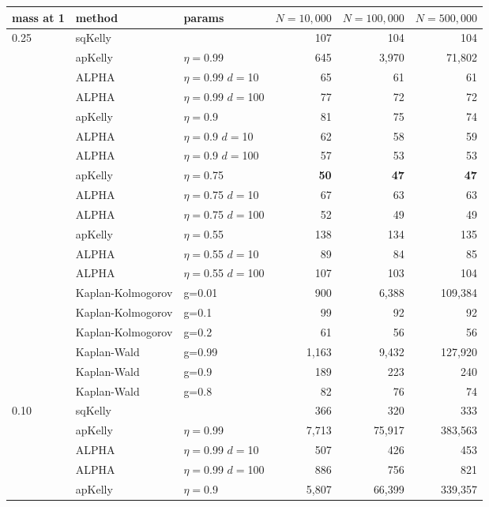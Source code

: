 \documentclass[12pt,runningheads]{llncs}
\begin{document}
{\begin{table}
\centering
\tiny
\begin{tabular}{lll|rrr} 
 mass at 1 & method & params & $N=10{,}000$ &  $N=100{,}000$ & $N=500{,}000$  \\
\hline 0.25 & sqKelly & & 107  & 104  & 104  \\
\cline{2-6} & apKelly & $\eta=$0.99 & 645  & 3,970  & 71,802  \\
\cline{2-6}
& ALPHA & $\eta=$0.99 $d=$10 & 65  & 61  & 61  \\
& ALPHA & $\eta=$0.99 $d=$100 & 77  & 72  & 72  \\
\cline{2-6} & apKelly & $\eta=$0.9 & 81  & 75  & 74  \\
\cline{2-6}
& ALPHA & $\eta=$0.9 $d=$10 & 62  & 58  & 59  \\
& ALPHA & $\eta=$0.9 $d=$100 & 57  & 53  & 53  \\
\cline{2-6} & apKelly & $\eta=$0.75 & \bf{50}  & \bf{47}  & \bf{47}  \\
\cline{2-6}
& ALPHA & $\eta=$0.75 $d=$10 & 67  & 63  & 63  \\
& ALPHA & $\eta=$0.75 $d=$100 & 52  & 49  & 49  \\
\cline{2-6} & apKelly & $\eta=$0.55 & 138  & 134  & 135  \\
\cline{2-6}
& ALPHA & $\eta=$0.55 $d=$10 & 89  & 84  & 85  \\
& ALPHA & $\eta=$0.55 $d=$100 & 107  & 103  & 104  \\
\cline{2-6}
 & Kaplan-Kolmogorov & g=0.01 & 900  & 6,388  & 109,384  \\
 & Kaplan-Kolmogorov & g=0.1 & 99  & 92  & 92  \\
 & Kaplan-Kolmogorov & g=0.2 & 61  & 56  & 56  \\
\cline{2-6}
 & Kaplan-Wald & g=0.99 & 1,163  & 9,432  & 127,920  \\
 & Kaplan-Wald & g=0.9 & 189  & 223  & 240  \\
 & Kaplan-Wald & g=0.8 & 82  & 76  & 74  \\
\hline 0.10 & sqKelly & & 366  & 320  & 333  \\
\cline{2-6} & apKelly & $\eta=$0.99 & 7,713  & 75,917  & 383,563  \\
\cline{2-6}
& ALPHA & $\eta=$0.99 $d=$10 & 507  & 426  & 453  \\
& ALPHA & $\eta=$0.99 $d=$100 & 886  & 756  & 821  \\
\cline{2-6} & apKelly & $\eta=$0.9 & 5,807  & 66,399  & 339,357  \\

\end{tabular}
\end{table}}
\end{document}
